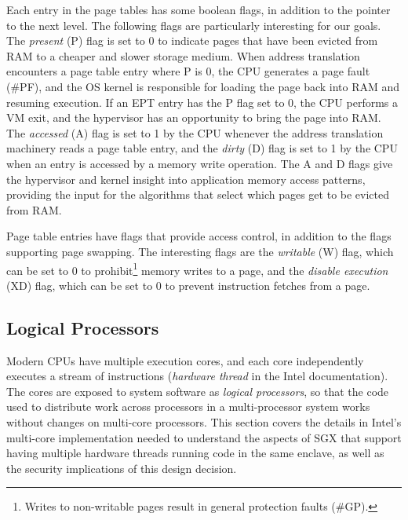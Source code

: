Each entry in the page tables has some boolean flags, in addition to the
pointer to the next level. The following flags are particularly interesting for
our goals. The \textit{present} (P) flag is set to 0 to indicate pages that
have been evicted from RAM to a cheaper and slower storage medium. When address
translation encounters a page table entry where P is 0, the CPU generates a
page fault (\#PF), and the OS kernel is responsible for loading the page back
into RAM and resuming execution. If an EPT entry has the P flag set to 0, the
CPU performs a VM exit, and the hypervisor has an opportunity to bring the page
into RAM. The \textit{accessed} (A) flag is set to 1 by the CPU whenever the
address translation machinery reads a page table entry, and the \textit{dirty}
(D) flag is set to 1 by the CPU when an entry is accessed by a memory write
operation. The A and D flags give the hypervisor and kernel insight into
application memory access patterns, providing the input for the algorithms that
select which pages get to be evicted from RAM.

Page table entries have flags that provide access control, in addition to the
flags supporting page swapping. The interesting flags are the \textit{writable}
(W) flag, which can be set to 0 to prohibit\footnote{Writes to non-writable
pages result in general protection faults (\#GP).} memory writes to a page, and
the \textit{disable execution} (XD) flag, which can be set to 0 to prevent
instruction fetches from a page.


\subsection{Logical Processors}
\label{sec:cores}

Modern CPUs have multiple execution cores, and each core independently executes
a stream of instructions (\textit{hardware thread} in the Intel documentation).
The cores are exposed to system software as \textit{logical processors}, so
that the code used to distribute work across processors in a multi-processor
system works without changes on multi-core processors. This section covers the
details in Intel's multi-core implementation needed to understand the aspects
of SGX that support having multiple hardware threads running code in the same
enclave, as well as the security implications of this design decision.

